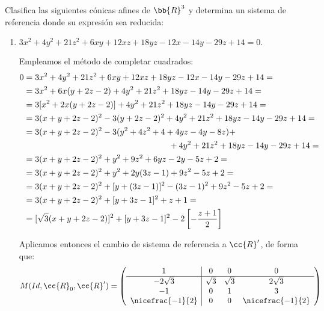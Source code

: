 \begin{ejercicio}
    Clasifica las siguientes cónicas afines de $\bb{R}^3$ y determina un sistema de referencia donde su expresión sea reducida:
    \begin{enumerate}
        \item $3x^2 + 4y^2 + 21z^2 + 6xy + 12xz + 18yz - 12x - 14y - 29z + 14 = 0.$

        Empleamos el método de completar cuadrados:
        \begin{equation*}
            \begin{split}
                0 &= 3x^2 + 4y^2 + 21z^2 + 6xy + 12xz + 18yz - 12x - 14y - 29z + 14 =\\
                &= 3x^2+6x(y+2z-2) + 4y^2 + 21z^2 + 18yz - 14y - 29z + 14 =\\
                &= 3[x^2+2x(y+2z-2)] + 4y^2 + 21z^2 + 18yz - 14y - 29z + 14 =\\
                &= 3(x + y+2z-2)^2-3(y+2z-2)^2 + 4y^2 + 21z^2 + 18yz - 14y - 29z + 14 =\\
                &= 3(x + y+2z-2)^2-3(y^2+4z^2+4+4yz-4y-8z) +\\&\hspace{0.5\linewidth}+4y^2 + 21z^2 + 18yz - 14y - 29z + 14 =\\
                &= 3(x + y+2z-2)^2 +y^2 + 9z^2 + 6yz - 2y - 5z + 2 =\\
                &= 3(x + y+2z-2)^2 +y^2 + 2y(3z-1) + 9z^2- 5z + 2 =\\
                &= 3(x + y+2z-2)^2 + [y+(3z-1)]^2 -(3z-1)^2 + 9z^2- 5z + 2 =\\
                &= 3(x + y+2z-2)^2 + [y+3z-1]^2 +z +1 =\\
                &= [\sqrt{3}(x + y+2z-2)]^2 + [y+3z-1]^2 -2\left[-\frac{z+1}{2}\right]
            \end{split}
        \end{equation*}

        Aplicamos entonces el cambio de sistema de referencia a $\cc{R}'$, de forma que:
        \begin{equation*}
            M(Id, \cc{R}_0, \cc{R}') = \left(\begin{array}{c|ccc}
                1 & 0 & 0 & 0 \\ \hline
                -2\sqrt{3} & \sqrt{3} & \sqrt{3} & 2\sqrt{3} \\
                -1 & 0 & 1 & 3 \\
                \nicefrac{-1}{2} & 0 & 0 & \nicefrac{-1}{2}
            \end{array}\right)
        \end{equation*}


\end{enumerate}
\end{ejercicio}
